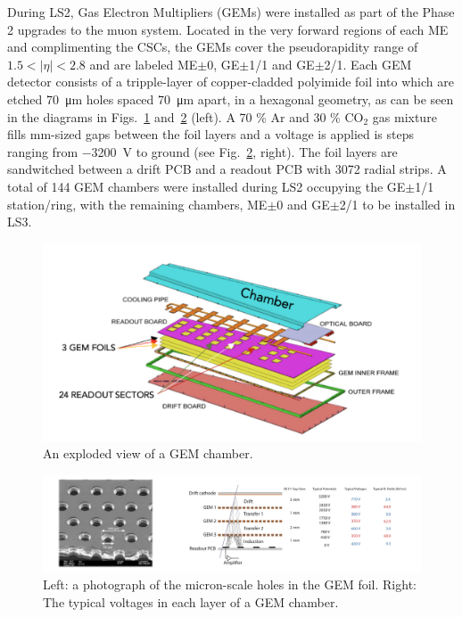 During LS2, Gas Electron Multipliers (GEMs) \cite{GEM} were installed as part of the Phase 2 upgrades to the muon system. Located in the very forward regions of each ME and complimenting the CSCs, the GEMs cover the pseudorapidity range of $1.5<|\eta|<2.8$ and are labeled ME$\pm$0, GE$\pm$1/1 and GE$\pm$2/1. Each GEM detector consists of a tripple-layer of copper-cladded polyimide foil into which are etched \SI{70}{\micro \meter} holes spaced \SI{70}{\micro\meter} apart, in a hexagonal geometry, as can be seen in the diagrams in Figs.~\ref{fig:GEMDiagram} and~\ref{fig:GEMDiagram2} (left). A 70 \% Ar and 30 \% CO$_2$ gas mixture fills mm-sized gaps between the foil layers and a voltage is applied is steps ranging from \SI{-3200}{V} to ground (see Fig.~\ref{fig:GEMDiagram2}, right). The foil layers are sandwitched between a drift PCB and a readout PCB with 3072 radial strips. A total of 144 GEM chambers were installed during LS2 occupying the GE$\pm$1/1 station/ring, with the remaining chambers, ME$\pm$0 and GE$\pm$2/1 to be installed in LS3. 

\begin{figure}[H]
    \centering
    \includegraphics[width=\textwidth]{Images/CMS/GEMDiagram.png}
    \caption{An exploded view of a GEM chamber.}
    \label{fig:GEMDiagram}
\end{figure}

\begin{figure}[H]
    \centering
    \includegraphics[width=\textwidth]{Images/CMS/GEMDiagram2.png}
    \caption{Left: a photograph of the micron-scale holes in the GEM foil. Right: The typical voltages in each layer of a GEM chamber.}
    \label{fig:GEMDiagram2}
\end{figure}